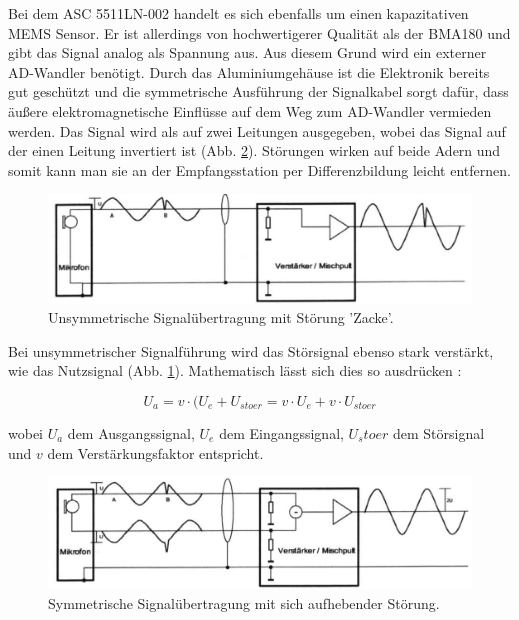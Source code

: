 \documentclass[12pt,a4paper]{scrartcl}
\begin{document}
Bei dem ASC 5511LN-002 handelt es sich ebenfalls um einen kapazitativen MEMS Sensor. Er ist allerdings von hochwertigerer Qualität als der BMA180 und gibt das Signal analog als Spannung aus. Aus diesem Grund wird ein externer AD-Wandler benötigt.
Durch das Aluminiumgehäuse ist die Elektronik bereits gut geschützt und die symmetrische Ausführung der Signalkabel sorgt dafür, dass äußere elektromagnetische Einflüsse auf dem Weg zum AD-Wandler vermieden werden. Das Signal wird als auf zwei Leitungen ausgegeben, wobei das Signal auf der einen Leitung invertiert ist (Abb. \ref{symmetrisch}). Störungen wirken auf beide Adern und somit kann man sie an der Empfangsstation per Differenzbildung leicht entfernen. 
\begin{figure}[H]
\centering
\includegraphics[scale=.7]{unsymmetrisch.png}
\caption{Unsymmetrische Signalübertragung mit Störung 'Zacke'. \citep{Sengpiel:2001fk}}
\label{unsymmetrisch}
\end{figure}


Bei unsymmetrischer Signalführung wird das Störsignal ebenso stark verstärkt, wie das Nutzsignal (Abb. \ref{unsymmetrisch}). Mathematisch lässt sich dies so ausdrücken \citep{Sengpiel:2001fk}:

\begin{equation}
U_a = v \cdot (U_e + U_{stoer} = v \cdot U_e + v \cdot U_{stoer}
\end{equation}

wobei $U_a$ dem Ausgangssignal, $U_e$ dem Eingangssignal, $U_stoer$ dem Störsignal und $v$ dem Verstärkungsfaktor entspricht.

\begin{figure}[H]
\centering
\includegraphics[scale=.7]{symmetrisch.png}
\caption{Symmetrische Signalübertragung mit sich aufhebender Störung. \citep{Sengpiel:2001fk}}
\label{symmetrisch}
\end{figure}
\end{document}
